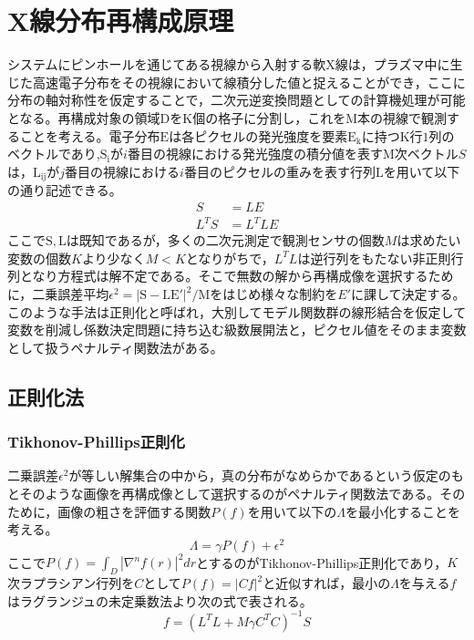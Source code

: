 \chapter{X線分布再構成原理}
システムにピンホールを通じてある視線から入射する軟X線は，プラズマ中に生じた高速電子分布をその視線において線積分した値と捉えることができ，ここに分布の軸対称性を仮定することで，二次元逆変換問題としての計算機処理が可能となる。再構成対象の領域$\mathrm{D}$を$\mathrm{K}$個の格子に分割し，これを$\mathrm{M}$本の視線で観測することを考える。電子分布$\mathrm{E}$は各ピクセルの発光強度を要素$\mathrm{E_k}$に持つ$\mathrm{K}$行$1$列のベクトルであり,$\mathrm{S_i}$が$i$番目の視線における発光強度の積分値を表す$\mathrm{M}$次ベクトル$S$は，$\mathrm{L_{ij}}$が$j$番目の視線における$i$番目のピクセルの重みを表す行列$\mathrm{L}$を用いて以下の通り記述できる。
\begin{align}
	S &= LE\\
	L^{T}S &= L^{T}LE 
	\label{eq;s=le}
\end{align}
ここで$\mathrm{S, L}$は既知であるが，多くの二次元測定で観測センサの個数$M$は求めたい変数の個数$K$より少なく$M < K$となりがちで，$L^{T}L$は逆行列をもたない非正則行列となり方程式は解不定である。そこで無数の解から再構成像を選択するために，二乗誤差平均$\epsilon^2 = \mathrm{|S - LE'|^2/M}$をはじめ様々な制約を$E'$に課して決定する。このような手法は正則化と呼ばれ，大別してモデル関数群の線形結合を仮定して変数を削減し係数決定問題に持ち込む級数展開法と，ピクセル値をそのまま変数として扱うペナルティ関数法がある。
\section{正則化法}
\subsection{Tikhonov-Phillips正則化}
二乗誤差$\epsilon^2$が等しい解集合の中から，真の分布がなめらかであるという仮定のもとそのような画像を再構成像として選択するのがペナルティ関数法である。そのために，画像の粗さを評価する関数$P(f)$を用いて以下の$\Lambda$を最小化することを考える。
\begin{equation}
	\Lambda = \gamma P(f) + \epsilon^2
	\label{eq;lambda}
\end{equation}
ここで$P(f) = \int_{D}|\nabla^nf(r)|^2dr$とするのがTikhonov-Phillips正則化であり，$K$次ラプラシアン行列を$C$として$P(f) = |Cf|^2$と近似すれば，最小の$\Lambda$を与える$f$はラグランジュの未定乗数法より次の式で表される。
\begin{equation}
	f = (L^{T}L + M\gamma C^{T}C)^{-1}S
\end{equation}
